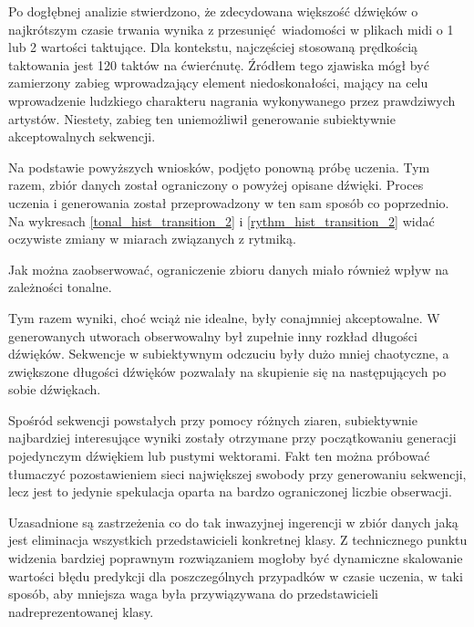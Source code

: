 {{        %

        Po dogłębnej analizie stwierdzono, że zdecydowana większość dźwięków o najkrótszym czasie trwania
        wynika z przesunięć wiadomości w plikach midi o 1 lub 2 wartości taktujące. Dla kontekstu, najczęściej stosowaną
        prędkością taktowania jest 120 taktów na ćwierćnutę. Źródłem tego zjawiska mógł być zamierzony 
        zabieg wprowadzający element niedoskonałości, mający na celu wprowadzenie ludzkiego charakteru nagrania 
        wykonywanego przez prawdziwych artystów.
        Niestety, zabieg ten uniemożliwił generowanie subiektywnie akceptowalnych sekwencji.

        Na podstawie powyższych wniosków, podjęto ponowną próbę uczenia. Tym razem, zbiór danych został
        ograniczony o powyżej opisane dźwięki. Proces uczenia i generowania został przeprowadzony w ten sam sposób
        co poprzednio. 
        Na wykresach \ref{tonal_hist_transition_2} i \ref{rythm_hist_transition_2} widać oczywiste zmiany w miarach związanych z rytmiką. 

        

        Jak można zaobserwować, ograniczenie zbioru danych miało również wpływ na zależności tonalne.

        


        Tym razem wyniki, choć wciąż nie idealne, były conajmniej akceptowalne. 
        W generowanych utworach
        obserwowalny był zupełnie inny rozkład długości dźwięków. Sekwencje w subiektywnym odczuciu były dużo mniej
        chaotyczne, a zwiększone długości dźwięków pozwalały na skupienie się na następujących po sobie dźwiękach.
        
        Spośród sekwencji powstałych przy pomocy różnych ziaren, subiektywnie najbardziej interesujące wyniki
        zostały otrzymane przy początkowaniu generacji pojedynczym dźwiękiem lub pustymi wektorami.
        Fakt ten można próbować tłumaczyć pozostawieniem sieci największej swobody przy generowaniu sekwencji, lecz
        jest to jedynie spekulacja oparta na bardzo ograniczonej liczbie obserwacji.


        Uzasadnione są zastrzeżenia co do tak inwazyjnej ingerencji w zbiór danych jaką jest eliminacja 
        wszystkich przedstawicieli konkretnej klasy. Z technicznego punktu widzenia bardziej poprawnym 
        rozwiązaniem mogłoby być dynamiczne skalowanie wartości błędu predykcji dla poszczególnych przypadków w czasie uczenia, 
        w taki sposób, aby mniejsza waga była przywiązywana do przedstawicieli nadreprezentowanej klasy.
    }
}